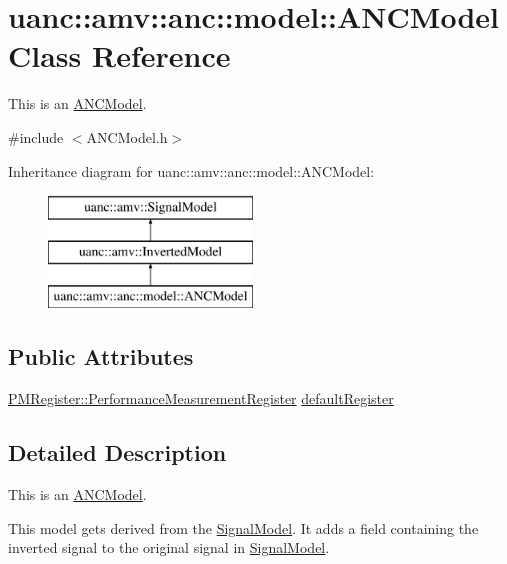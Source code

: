 \hypertarget{classuanc_1_1amv_1_1anc_1_1model_1_1_a_n_c_model}{}\section{uanc\+:\+:amv\+:\+:anc\+:\+:model\+:\+:A\+N\+C\+Model Class Reference}
\label{classuanc_1_1amv_1_1anc_1_1model_1_1_a_n_c_model}


This is an \hyperlink{classuanc_1_1amv_1_1anc_1_1model_1_1_a_n_c_model}{A\+N\+C\+Model}.  




{\ttfamily \#include $<$A\+N\+C\+Model.\+h$>$}

Inheritance diagram for uanc\+:\+:amv\+:\+:anc\+:\+:model\+:\+:A\+N\+C\+Model\+:\begin{figure}[H]
\begin{center}
\leavevmode
\includegraphics[height=3.000000cm]{classuanc_1_1amv_1_1anc_1_1model_1_1_a_n_c_model}
\end{center}
\end{figure}
\subsection*{Public Attributes}
\begin{DoxyCompactItemize}
\item 
\hyperlink{classuanc_1_1amv_1_1_p_m_register_1_1_performance_measurement_register}{P\+M\+Register\+::\+Performance\+Measurement\+Register} \hyperlink{classuanc_1_1amv_1_1anc_1_1model_1_1_a_n_c_model_a1e7a3078128b1b92eda1e0bbfbfaa610}{default\+Register}
\end{DoxyCompactItemize}


\subsection{Detailed Description}
This is an \hyperlink{classuanc_1_1amv_1_1anc_1_1model_1_1_a_n_c_model}{A\+N\+C\+Model}. 

This model gets derived from the \hyperlink{classuanc_1_1amv_1_1_signal_model}{Signal\+Model}. It adds a field containing the inverted signal to the original signal in \hyperlink{classuanc_1_1amv_1_1_signal_model}{Signal\+Model}. 

